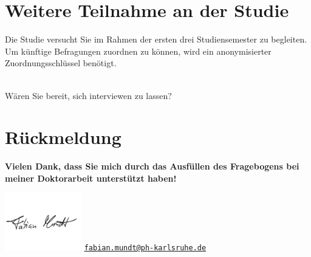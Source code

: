 
\vspace{-.25cm}
\section{Weitere Teilnahme an der Studie}
\vspace{.25cm}

\begin{choicequestion}[4]{Die Studie versucht Sie im Rahmen der ersten drei Studiensemester zu begleiten. Um künftige Befragungen zuordnen zu können, wird ein anonymisierter Zuordnungsschlüssel benötigt.}
	\\
	\\
\end{choicequestion}

\separate

\begin{choicequestion}[1]{Wären Sie bereit, sich interviewen zu lassen?}
\end{choicequestion}

\vspace{.25cm}
\section{Rückmeldung}
\vspace{.25cm}



\separate

\textbf{Vielen Dank, dass Sie mich durch das Ausfüllen des Fragebogens bei meiner Doktorarbeit unterstützt haben!}

\vspace{-1.5cm}
\flushright
\includegraphics[width=0.25\textwidth]{unterschrift.png}
\vspace{-1.5cm}
\flushright
\href{mailto:fabian.mundt@ph-karlsruhe.de}{\nolinkurl{fabian.mundt@ph-karlsruhe.de}}
